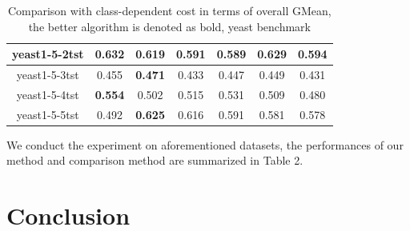 \documentclass{article}
\begin{document}
\begin{table}[!ht]
\begin{tabular}{|c||c|ccccc|}
	yeast1-5-2tst             & \textbf{0.632}                        & \multicolumn{1}{c|}{0.619}          & \multicolumn{1}{c|}{0.591}          & \multicolumn{1}{c|}{0.589}      & \multicolumn{1}{c|}{0.629}      & 0.594          \\ \hline
	yeast1-5-3tst             & 0.455                                 & \multicolumn{1}{c|}{\textbf{0.471}} & \multicolumn{1}{c|}{0.433}          & \multicolumn{1}{c|}{0.447}      & \multicolumn{1}{c|}{0.449}      & 0.431          \\ \hline
	yeast1-5-4tst             & \textbf{0.554}                        & \multicolumn{1}{c|}{0.502}          & \multicolumn{1}{c|}{0.515}          & \multicolumn{1}{c|}{0.531}      & \multicolumn{1}{c|}{0.509}      & 0.480          \\ \hline
	yeast1-5-5tst             & 0.492                                 & \multicolumn{1}{c|}{\textbf{0.625}} & \multicolumn{1}{c|}{0.616}          & \multicolumn{1}{c|}{0.591}      & \multicolumn{1}{c|}{0.581}      & 0.578          \\ \hline
\end{tabular}
	\label{tab03:overall}
	\caption{Comparison with class-dependent cost in terms of overall GMean, the better algorithm is denoted as bold, yeast benchmark}
\end{table}

We conduct the experiment on aforementioned datasets, the performances of our method and comparison method are summarized in Table 2.

\section{Conclusion}
\end{document}

